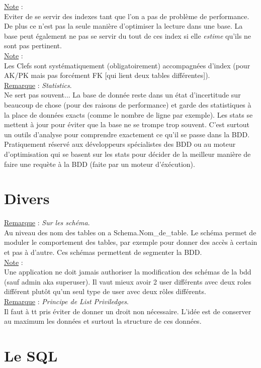 \documentclass[a4paper,12pt,twoside]{article}
\newcommand{\rem}[2]{\noindent\underline{Remarque} : \textit{#1}.\\ \indent #2}
\newcommand{\note}[1]{\noindent\underline{Note} : \\ \indent #1}
\begin{document}
\note{Eviter de se servir des indexes tant que l'on a pas de problème de performance. De plus ce n'est pas la seule manière d'optimiser la lecture dans une base. La base peut également ne pas se servir du tout de ces index si elle \textit{estime} qu'ils ne sont pas pertinent.}\\

\note{Les Clefs sont systématiquement (obligatoirement) accompagnées d'index (pour AK/PK mais pas forcément FK [qui lient deux tables différentes]).}\\

\rem{Statistics}{Ne sert pas souvent... La base de donnée reste dans un état d'incertitude sur beaucoup de chose (pour des raisons de performance) et garde des statistiques à la place de données exacts (comme le nombre de ligne par exemple). Les stats se mettent à jour pour éviter que la base ne se trompe trop souvent. C'est surtout un outils d'analyse pour comprendre exactement ce qu'il se passe dans la BDD. Pratiquement réservé aux développeurs spécialistes des BDD ou au moteur d'optimisation qui se basent sur les stats pour décider de la meilleur manière de faire une requète à la BDD (faite par un moteur d'éxécution).}\\

\section{Divers}

\rem{Sur les schéma}{Au niveau des nom des tables on a Schema.Nom\_de\_table. Le schéma permet de moduler le comportement des tables, par exemple pour donner des accès à certain et pas à d'autre. Ces schémas permettent de segmenter la BDD.}\\

\note{Une application ne doit jamais authoriser la modification des schémas de la bdd (sauf admin aka superuser). Il vaut mieux avoir 2 user différents avec deux roles différent plutôt qu'un seul type de user avec deux rôles différents.}\\

\rem{Principe de List Priviledges}{Il faut à tt pris éviter de donner un droit non nécessaire. L'idée est de conserver au maximum les données et surtout la structure de ces données.}\\

\section{Le SQL}
\end{document}
